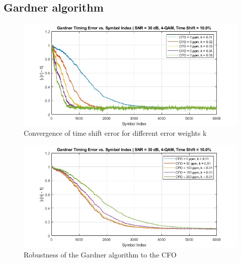 \documentclass[11pt]{article}
\begin{document}
	\subsection{Gardner algorithm}
	
	\begin{figure}[H]
		\centering
		\includegraphics[scale=0.5]{Images/Gardner_k_list.jpg}
		\caption{Convergence of time shift error for different error weights k}
		\label{fig:gardner1}
	\end{figure}
	
	\begin{figure}[H]
		\centering
		\includegraphics[scale=0.5]{Images/Gardner_CFO_robust.jpg}
		\caption{Robustness of the Gardner algorithm to the CFO}
		\label{fig:gardner2}
	\end{figure}
	
	
	
\end{document}
